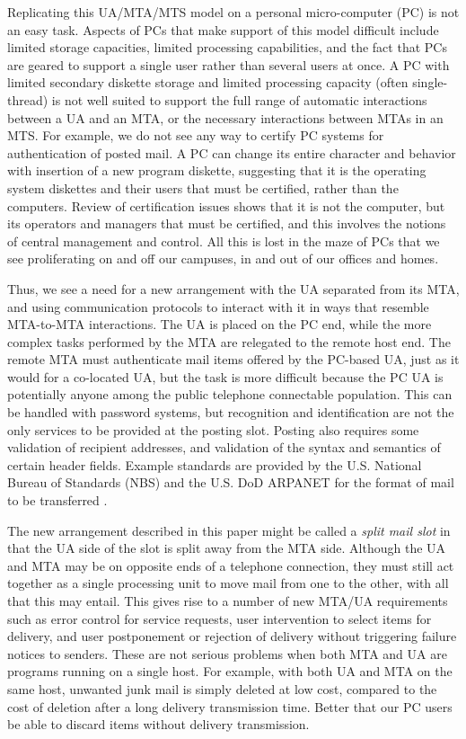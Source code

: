 Replicating this UA/MTA/MTS model on a personal micro-computer (PC)
is not an easy task.
Aspects of PCs that make support of this model difficult include
limited storage capacities,
limited processing capabilities,
and the fact that PCs are geared to support a single user
rather than several users at once.
A PC with limited secondary diskette storage and 
limited processing capacity (often single-thread) is not well suited 
to support the full range of automatic interactions between a UA and 
an MTA, or the necessary interactions between MTAs in an MTS. 
For example,
we do not see any way to certify PC systems for authentication 
of posted mail.  
A PC can change its entire character and behavior with insertion of a new 
program diskette, suggesting that it is the operating system 
diskettes and their users that must be certified, rather than the computers.  
Review of certification issues shows that it is not the computer, 
but its operators and managers that must be certified, 
and this involves the notions of central management and control.  
All this is lost in the maze of PCs that we see proliferating 
on and off our campuses, in and out of our offices and homes.  

Thus, we see a need for a new arrangement with the UA separated from 
its MTA, and using communication protocols to interact with it in ways 
that resemble MTA-to-MTA interactions.
The UA is placed on the PC end, while the more complex
tasks performed by the MTA are relegated to the remote host end.
The remote MTA must authenticate mail items offered by the PC-based 
UA, just as it would for a co-located UA, but the task is more difficult 
because the PC UA is potentially anyone among the public telephone 
connectable population.  
This can be handled with password systems, but recognition and 
identification are not the only services to be provided at the posting slot.  
Posting also requires some validation of recipient addresses, 
and validation of the syntax and semantics of certain header fields.
Example standards are provided by the U.S. National Bureau of Standards 
(NBS) and the U.S. DoD ARPANET for the format of mail to be transferred
\cite{RFC-822,NBS,CCITT}.

The new arrangement described in this paper might be called a
{\it split mail slot} in that the UA side of the slot is split away from 
the MTA side.  
Although the UA and MTA may be on opposite ends of a telephone connection, 
they must still act together as a single processing unit 
to move mail from one to the other, with all that this may entail.  
This gives rise to a number of new MTA/UA requirements such as error 
control for service requests, user intervention to select items for 
delivery, and user postponement or rejection of delivery without 
triggering failure notices to senders.  
These are not serious problems when both MTA and UA are 
programs running on a single host.  
For example, with both UA and MTA on the same host, 
unwanted junk mail is simply deleted at low cost, 
compared to the cost of deletion after a long delivery transmission time.  
Better that our PC users be able to discard items 
without delivery transmission.  

